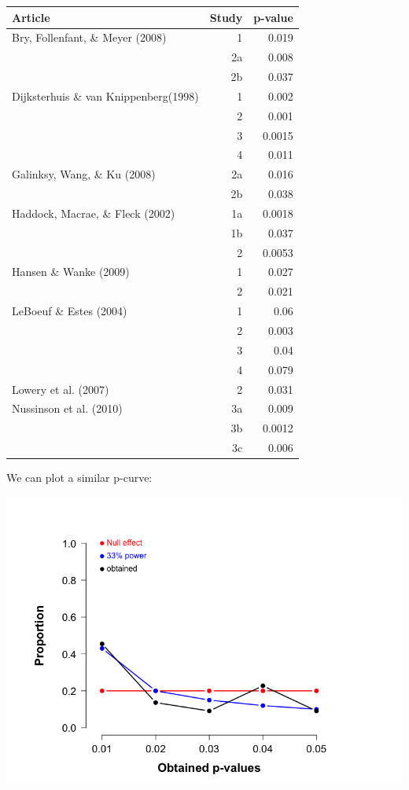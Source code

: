 \documentclass[11pt]{article}
\begin{document}
\begin{center}
\begin{tabular}{lrr}
Article & Study & p-value\\
\hline
Bry, Follenfant, \& Meyer (2008) & 1 & 0.019\\
 & 2a & 0.008\\
 & 2b & 0.037\\
Dijksterhuis \& van Knippenberg(1998) & 1 & 0.002\\
 & 2 & 0.001\\
 & 3 & 0.0015\\
 & 4 & 0.011\\
Galinksy, Wang, \& Ku (2008) & 2a & 0.016\\
 & 2b & 0.038\\
Haddock, Macrae, \& Fleck (2002) & 1a & 0.0018\\
 & 1b & 0.037\\
 & 2 & 0.0053\\
Hansen \& Wanke (2009) & 1 & 0.027\\
 & 2 & 0.021\\
LeBoeuf \& Estes (2004) & 1 & 0.06\\
 & 2 & 0.003\\
 & 3 & 0.04\\
 & 4 & 0.079\\
Lowery et al. (2007) & 2 & 0.031\\
Nussinson et al. (2010) & 3a & 0.009\\
 & 3b & 0.0012\\
 & 3c & 0.006\\
\end{tabular}
\end{center}


We can plot a similar p-curve:

\includegraphics[width=.9\linewidth]{figures/p-curve-professor.png}
\end{document}
